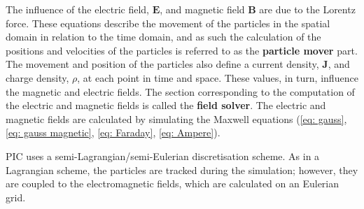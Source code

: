 The influence of the electric field, $\textbf{E}$, and magnetic field $\textbf{B}$ are due to the Lorentz force. 
These equations describe the movement of the particles in the spatial domain in relation to the time domain, and as such the calculation of the positions and velocities of the particles is referred to as the \textbf{particle mover} part. The movement and position of the particles also define a current density, \textbf{J}, and charge density, $\rho$, at each point in time and space. These values, in turn, influence the magnetic and electric fields. The section corresponding to the computation of the electric and magnetic fields is called the \textbf{field solver}. The electric and magnetic fields are calculated by simulating the Maxwell equations (\ref{eq: gauss}, \ref{eq: gauss magnetic}, \ref{eq: Faraday}, \ref{eq: Ampere}). 

PIC uses a semi-Lagrangian/semi-Eulerian discretisation scheme. As in a Lagrangian scheme, the particles are tracked during the simulation; however, they are coupled to the electromagnetic fields, which are calculated on an Eulerian grid. 

